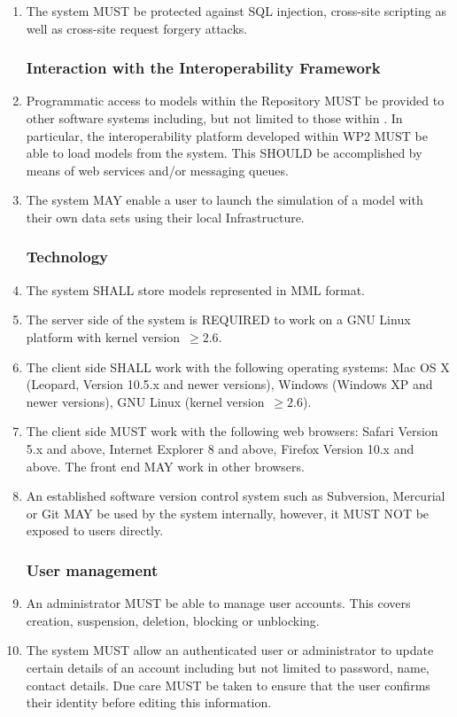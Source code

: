 \begin{enumerate}[1]
\item The system MUST be protected against SQL injection, cross-site scripting as well as cross-site request forgery attacks. 

\subsubsection{Interaction with the Interoperability Framework}
\item Programmatic access to models within the Repository MUST be provided to other software systems including, but not limited to those within \ddmore. In particular, the interoperability platform developed within WP2 MUST be able to load models from the system. This SHOULD be accomplished by means of web services and/or messaging queues. 

\item The system MAY enable a user to launch the simulation of a model with their own data sets using their local Infrastructure. 

\subsubsection{Technology}
\item The system SHALL store models represented in MML format.

\item The server side of the system is REQUIRED to work on a GNU Linux platform with kernel version~$\ge 2.6$. 

\item The client side SHALL work with the following operating systems: Mac OS X (Leopard, Version 10.5.x and newer versions), Windows (Windows XP and newer versions), GNU Linux (kernel version~$\ge 2.6$).

\item The client side MUST work with the following web browsers: Safari Version 5.x and above, Internet Explorer 8 and above, Firefox Version 10.x and above. The front end MAY work in other browsers.

\item An established software version control system such as Subversion, Mercurial or Git MAY be used by the system internally, however, it MUST NOT be exposed to users directly.

\subsubsection{User management}
\item An administrator MUST be able to manage user accounts. This covers creation, suspension, deletion, blocking or unblocking.

\item The system MUST allow an authenticated user or administrator to update certain details of an account including but not limited to password, name, contact details. Due care MUST be taken to ensure that the user confirms their identity before editing this information.
\end{enumerate}

